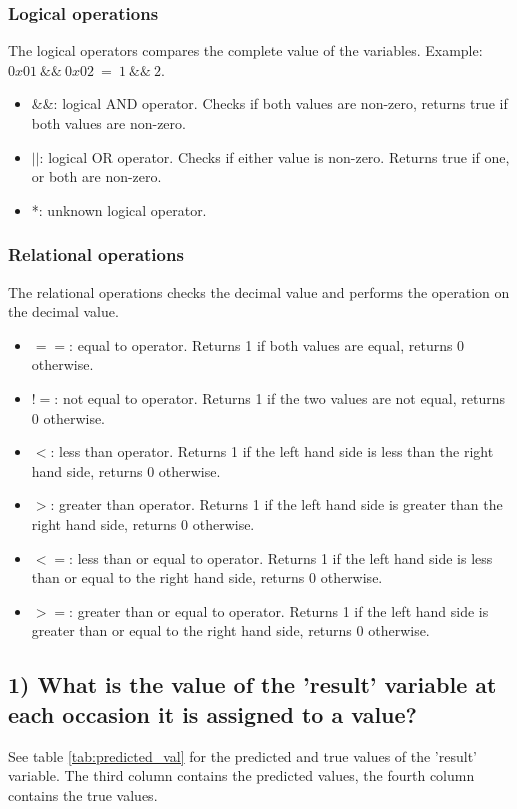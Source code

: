 \subsubsection{Logical operations}
The logical operators compares the complete value of the variables. Example: $0x01\: \&\&\: 0x02\: =\: 1 \:\&\&\: 2$.
\begin{itemize}
    \item \&\&: logical AND operator. Checks if both values are non-zero, returns true if both values are non-zero.
    \item $||$: logical OR operator. Checks if either value is non-zero. Returns true if one, or both are non-zero.
    \item *: unknown logical operator.
\end{itemize}
\subsubsection{Relational operations}
The relational operations checks the decimal value and performs the operation on the decimal value.
\begin{itemize}
    \item $==$: equal to operator. Returns 1 if both values are equal, returns 0 otherwise.
    \item $!=$: not equal to operator. Returns 1 if the two values are not equal, returns 0 otherwise.
    \item $<$: less than operator. Returns 1 if the left hand side is less than the right hand side, returns 0 otherwise.
    \item $>$: greater than operator. Returns 1 if the left hand side is greater than the right hand side, returns 0 otherwise.
    \item $<=$: less than or equal to operator. Returns 1 if the left hand side is less than or equal to the right hand side, returns 0 otherwise.
    \item $>=$: greater than or equal to operator. Returns 1 if the left hand side is greater than or equal to the right hand side, returns 0 otherwise.
\end{itemize}
\subsection{1) What is the value of the 'result' variable at each occasion it is assigned to a value?}
See table \ref{tab:predicted_val} for the predicted and true values of the 'result' variable. The third column contains the predicted values, the fourth column contains the true values.

